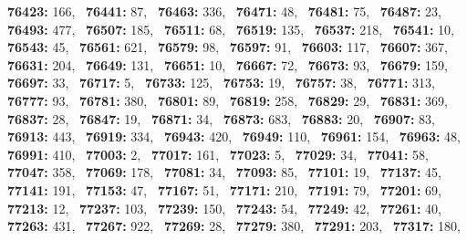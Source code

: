 \textbf{76423:} 166,\allowbreak~ 
\textbf{76441:} 87,\allowbreak~ 
\textbf{76463:} 336,\allowbreak~ 
\textbf{76471:} 48,\allowbreak~ 
\textbf{76481:} 75,\allowbreak~ 
\textbf{76487:} 23,\allowbreak~ 
\textbf{76493:} 477,\allowbreak~ 
\textbf{76507:} 185,\allowbreak~ 
\textbf{76511:} 68,\allowbreak~ 
\textbf{76519:} 135,\allowbreak~ 
\textbf{76537:} 218,\allowbreak~ 
\textbf{76541:} 10,\allowbreak~ 
\textbf{76543:} 45,\allowbreak~ 
\textbf{76561:} 621,\allowbreak~ 
\textbf{76579:} 98,\allowbreak~ 
\textbf{76597:} 91,\allowbreak~ 
\textbf{76603:} 117,\allowbreak~ 
\textbf{76607:} 367,\allowbreak~ 
\textbf{76631:} 204,\allowbreak~ 
\textbf{76649:} 131,\allowbreak~ 
\textbf{76651:} 10,\allowbreak~ 
\textbf{76667:} 72,\allowbreak~ 
\textbf{76673:} 93,\allowbreak~ 
\textbf{76679:} 159,\allowbreak~ 
\textbf{76697:} 33,\allowbreak~ 
\textbf{76717:} 5,\allowbreak~ 
\textbf{76733:} 125,\allowbreak~ 
\textbf{76753:} 19,\allowbreak~ 
\textbf{76757:} 38,\allowbreak~ 
\textbf{76771:} 313,\allowbreak~ 
\textbf{76777:} 93,\allowbreak~ 
\textbf{76781:} 380,\allowbreak~ 
\textbf{76801:} 89,\allowbreak~ 
\textbf{76819:} 258,\allowbreak~ 
\textbf{76829:} 29,\allowbreak~ 
\textbf{76831:} 369,\allowbreak~ 
\textbf{76837:} 28,\allowbreak~ 
\textbf{76847:} 19,\allowbreak~ 
\textbf{76871:} 34,\allowbreak~ 
\textbf{76873:} 683,\allowbreak~ 
\textbf{76883:} 20,\allowbreak~ 
\textbf{76907:} 83,\allowbreak~ 
\textbf{76913:} 443,\allowbreak~ 
\textbf{76919:} 334,\allowbreak~ 
\textbf{76943:} 420,\allowbreak~ 
\textbf{76949:} 110,\allowbreak~ 
\textbf{76961:} 154,\allowbreak~ 
\textbf{76963:} 48,\allowbreak~ 
\textbf{76991:} 410,\allowbreak~ 
\textbf{77003:} 2,\allowbreak~ 
\textbf{77017:} 161,\allowbreak~ 
\textbf{77023:} 5,\allowbreak~ 
\textbf{77029:} 34,\allowbreak~ 
\textbf{77041:} 58,\allowbreak~ 
\textbf{77047:} 358,\allowbreak~ 
\textbf{77069:} 178,\allowbreak~ 
\textbf{77081:} 34,\allowbreak~ 
\textbf{77093:} 85,\allowbreak~ 
\textbf{77101:} 19,\allowbreak~ 
\textbf{77137:} 45,\allowbreak~ 
\textbf{77141:} 191,\allowbreak~ 
\textbf{77153:} 47,\allowbreak~ 
\textbf{77167:} 51,\allowbreak~ 
\textbf{77171:} 210,\allowbreak~ 
\textbf{77191:} 79,\allowbreak~ 
\textbf{77201:} 69,\allowbreak~ 
\textbf{77213:} 12,\allowbreak~ 
\textbf{77237:} 103,\allowbreak~ 
\textbf{77239:} 150,\allowbreak~ 
\textbf{77243:} 54,\allowbreak~ 
\textbf{77249:} 42,\allowbreak~ 
\textbf{77261:} 40,\allowbreak~ 
\textbf{77263:} 431,\allowbreak~ 
\textbf{77267:} 922,\allowbreak~ 
\textbf{77269:} 28,\allowbreak~ 
\textbf{77279:} 380,\allowbreak~ 
\textbf{77291:} 203,\allowbreak~ 
\textbf{77317:} 180,\allowbreak~ 
